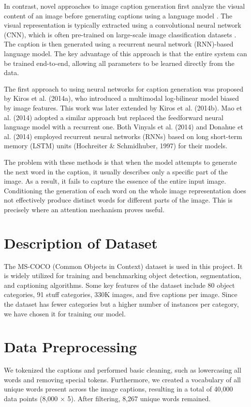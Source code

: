 \documentclass{article}
\begin{document}
In contrast, novel approaches to image caption generation first analyze the visual content of an image before generating captions using a language model \cite{kuznetsova2012}. The visual representation is typically extracted using a convolutional neural network (CNN), which is often pre-trained on large-scale image classification datasets \cite{karpathy2017}. The caption is then generated using a recurrent neural network (RNN)-based language model. The key advantage of this approach is that the entire system can be trained end-to-end, allowing all parameters to be learned directly from the data.


The first approach to using neural networks for caption generation was proposed by Kiros et al. (2014a), who introduced a multimodal log-bilinear model biased by image features. This work was later extended by Kiros et al. (2014b). Mao et al. (2014) adopted a similar approach but replaced the feedforward neural language model with a recurrent one. Both Vinyals et al. (2014) and Donahue et al. (2014) employed recurrent neural networks (RNNs) based on long short-term memory (LSTM) units (Hochreiter \& Schmidhuber, 1997) for their models.


The problem with these methods is that when the model attempts to generate the next word in the caption, it usually describes only a specific part of the image. As a result, it fails to capture the essence of the entire input image. Conditioning the generation of each word on the whole image representation does not effectively produce distinct words for different parts of the image. This is precisely where an attention mechanism proves useful.

\section{Description of Dataset}

The MS-COCO (Common Objects in Context) dataset is used in this project. It is widely utilized for training and benchmarking object detection, segmentation, and captioning algorithms. Some key features of the dataset include 80 object categories, 91 stuff categories, 330K images, and five captions per image. Since the dataset has fewer categories but a higher number of instances per category, we have chosen it for training our model.

\section{Data Preprocessing}
We tokenized the captions and performed basic cleaning, such as lowercasing all words and removing special tokens. Furthermore, we created a vocabulary of all unique words present across the image captions, resulting in a total of 40,000 data points (8,000 × 5). After filtering, 8,267 unique words remained.
\end{document}
